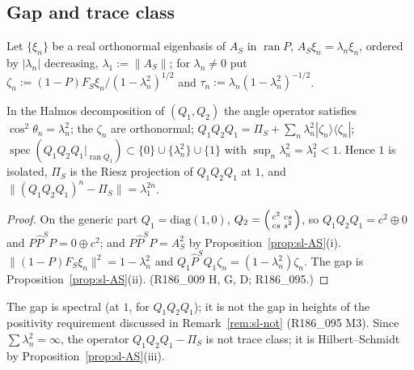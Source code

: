\subsection{Gap and trace class}\label{subsec:sl-trace}
Let $\{\xi_n\}$ be a real orthonormal eigenbasis of $A_S$ in $\operatorname{ran}P$, $A_S\xi_n=\lambda_n\xi_n$, ordered by
$|\lambda_n|$ decreasing, $\lambda_1:=\|A_S\|$; for $\lambda_n\ne0$ put $\zeta_n:=(1-P)F_S\xi_n/(1-\lambda_n^2)^{1/2}$ and
$\tau_n:=\lambda_n(1-\lambda_n^2)^{-1/2}$.

\begin{theorem}\label{thm:sl-gap}
In the Halmos decomposition of $(Q_1,Q_2)$ the angle operator satisfies $\cos^2\theta_n=\lambda_n^2$; the
$\zeta_n$ are orthonormal; $Q_1Q_2Q_1=\Pi_S+\sum_n\lambda_n^2|\zeta_n\rangle\langle\zeta_n|$;
$\operatorname{spec}(Q_1Q_2Q_1|_{\operatorname{ran}Q_1})\subset\{0\}\cup\{\lambda_n^2\}\cup\{1\}$ with
$\sup_n\lambda_n^2=\lambda_1^2<1$. Hence $1$ is isolated, $\Pi_S$ is the Riesz projection of $Q_1Q_2Q_1$ at $1$, and
$\|(Q_1Q_2Q_1)^n-\Pi_S\|=\lambda_1^{2n}$.
\end{theorem}
\begin{proof}
On the generic part $Q_1=\mathrm{diag}(1,0)$, $Q_2=\begin{psmallmatrix}c^2&cs\\cs&s^2\end{psmallmatrix}$, so
$Q_1Q_2Q_1=c^2\oplus0$ and $P\widehat P^SP=0\oplus c^2$; and $P\widehat P^SP=A_S^2$ by
Proposition~\ref{prop:sl-AS}(i). $\|(1-P)F_S\xi_n\|^2=1-\lambda_n^2$ and $Q_1\widehat P^SQ_1\zeta_n=(1-\lambda_n^2)\zeta_n$.
The gap is Proposition~\ref{prop:sl-AS}(ii). (R186\_009 H, G, D; R186\_095.)
\end{proof}
The gap is spectral (at $1$, for $Q_1Q_2Q_1$); it is not the gap in heights of the positivity
requirement discussed in Remark~\ref{rem:sl-not} (R186\_095 M3). Since $\sum\lambda_n^2=\infty$, the operator
$Q_1Q_2Q_1-\Pi_S$ is not trace class; it is Hilbert--Schmidt by Proposition~\ref{prop:sl-AS}(iii).

